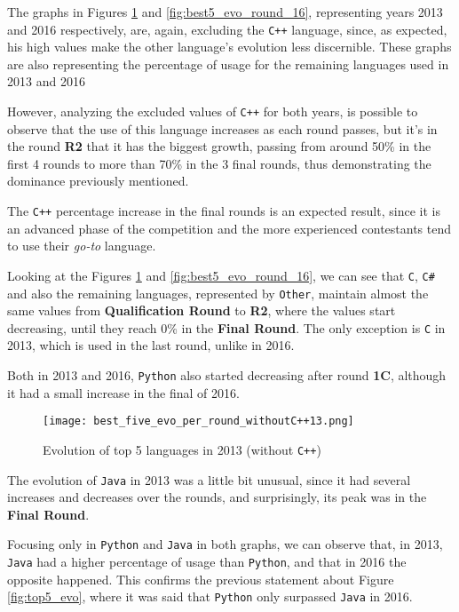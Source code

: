 \documentclass{article}
\begin{document}
\begin{multicols*}{2}
The graphs in Figures \ref{fig:best5_evo_round_13} and \ref{fig:best5_evo_round_16}, representing years 2013 and 2016 respectively, are, again, excluding the \texttt{C++} language, since, as expected, his high values make the other language's evolution less discernible.
These graphs are also representing the percentage of usage for the remaining languages used in 2013 and 2016


However, analyzing the excluded values of \texttt{C++} for both years, is possible to observe that the use of this language increases as each round passes, but it's in the round \textbf{R2} that it has the biggest growth, passing from around 50\% in the first 4 rounds to more than 70\% in the 3 final rounds, thus demonstrating the dominance previously mentioned.

The \texttt{C++} percentage increase in the final rounds is an expected result, since it is an advanced phase of the competition and the more experienced contestants tend to use their \textit{go-to} language.




Looking at the Figures \ref{fig:best5_evo_round_13} and \ref{fig:best5_evo_round_16}, we can see that \texttt{C}, \texttt{C\#} and also the remaining languages, represented by \texttt{Other}, maintain almost the same values from \textbf{Qualification Round} to \textbf{R2}, where the values start decreasing, until they reach 0\% in the \textbf{Final Round}. The only exception is \texttt{C} in 2013, which is used in the last round, unlike in 2016.

Both in 2013 and 2016, \texttt{Python} also started decreasing after round \textbf{1C}, although it had a small increase in the final of 2016.



\begin{figure}[H]
    \centering
    \texttt{[image: best\_five\_evo\_per\_round\_withoutC++13.png]}
    \caption{Evolution of top 5 languages in 2013 (without \texttt{C++})}
    \label{fig:best5_evo_round_13}
\end{figure}

The evolution of \texttt{Java} in 2013 was a little bit unusual, since it had several increases and decreases over the rounds, and surprisingly, its peak was in the \textbf{Final Round}.

Focusing only in \texttt{Python} and \texttt{Java} in both graphs, we can observe that, in 2013, \texttt{Java} had a higher percentage of usage than \texttt{Python}, and that in 2016 the opposite happened. This confirms the previous statement about Figure \ref{fig:top5_evo}, where it was said that \texttt{Python} only surpassed \texttt{Java} in 2016.


\end{multicols*}
\end{document}
